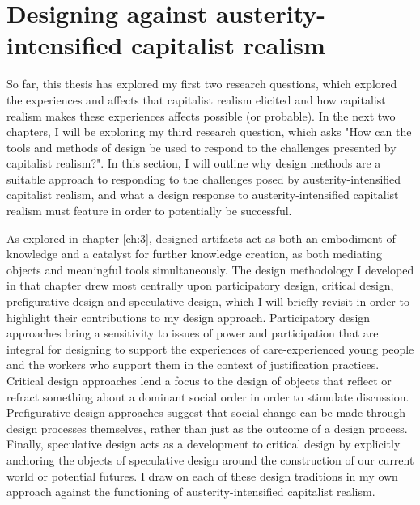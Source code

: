 \section{Designing against austerity-intensified capitalist realism}
\label{sec:7-2-methods}
So far, this thesis has explored my first two research questions, which explored the experiences and affects that capitalist realism elicited and how capitalist realism makes these experiences affects possible (or probable). In the next two chapters, I will be exploring my third research question, which asks "How can the tools and methods of design be used to respond to the challenges presented by capitalist realism?". In this section, I will outline why design methods are a suitable approach to responding to the challenges posed by austerity-intensified capitalist realism, and what a design response to austerity-intensified capitalist realism must feature in order to potentially be successful. 

As explored in chapter \ref{ch:3}, designed artifacts act as both an embodiment of knowledge and a catalyst for further knowledge creation, as both mediating objects and meaningful tools simultaneously. The design methodology I developed in that chapter drew most centrally upon participatory design, critical design, prefigurative design and speculative design, which I will briefly revisit in order to highlight their contributions to my design approach. Participatory design approaches bring a sensitivity to issues of power and participation that are integral for designing to support the experiences of care-experienced young people and the workers who support them in the context of justification practices. Critical design approaches lend a focus to the design of objects that reflect or refract something about a dominant social order in order to stimulate discussion. Prefigurative design approaches suggest that social change can be made through design processes themselves, rather than just as the outcome of a design process. Finally, speculative design acts as a development to critical design by explicitly anchoring the objects of speculative design around the construction of our current world or potential futures. I draw on each of these design traditions in my own approach against the functioning of austerity-intensified capitalist realism. 

